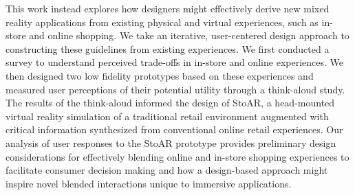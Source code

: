 

This work instead explores how designers might effectively derive new mixed reality applications from existing physical and virtual experiences, such as in-store and online shopping. 
We take an iterative, user-centered design approach to constructing these guidelines from existing experiences. We first conducted a survey to understand perceived trade-offs in in-store and online experiences. We then designed two low fidelity prototypes based on these experiences and measured user perceptions of their potential utility through a think-aloud study. The results of the think-aloud informed the design of StoAR, a head-mounted virtual reality simulation of a traditional retail environment augmented with critical information synthesized from conventional online retail experiences. Our analysis of user responses to the StoAR prototype provides preliminary design considerations for effectively blending online and in-store shopping experiences to facilitate consumer decision making and how a design-based approach might inspire novel blended interactions unique to immersive applications.

